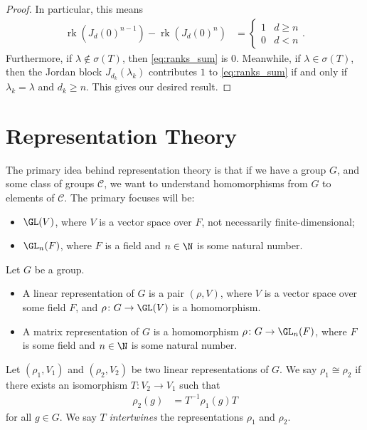 \documentclass[10pt]{mypackage}
\begin{document}
\begin{proof}
  In particular, this means
  \begin{align*}
    \operatorname{rk}\left( J_d(0)^{n-1} \right)- \operatorname{rk}\left( J_d(0)^{n} \right) &= \begin{cases}
      1 &d\geq n\\
      0 & d < n
    \end{cases}.
  \end{align*}
  Furthermore, if $\lambda\notin \sigma(T)$, then \eqref{eq:ranks_sum} is $0$. Meanwhile, if $\lambda\in \sigma(T)$, then the Jordan block $J_{d_k}\left(\lambda_k\right)$ contributes $1$ to \eqref{eq:ranks_sum} if and only if $\lambda_k = \lambda$ and $d_k \geq n$. This gives our desired result.
\end{proof}
\section{Representation Theory}%
The primary idea behind representation theory is that if we have a group $G$, and some class of groups $\mathcal{C}$, we want to understand homomorphisms from $G$ to elements of $\mathcal{C}$. The primary focuses will be:
\begin{itemize}
  \item $\GL(V)$, where $V$ is a vector space over $F$, not necessarily finite-dimensional;
  \item $\GL_n(F)$, where $F$ is a field and $n\in \N$ is some natural number.
\end{itemize}
\begin{definition}
  Let $G$ be a group.
  \begin{itemize}
    \item A linear representation of $G$ is a pair $\left( \rho,V \right)$, where $V$ is a vector space over some field $F$, and $\rho\colon G\rightarrow \GL(V)$ is a homomorphism.
    \item A matrix representation of $G$ is a homomorphism $\rho\colon G\rightarrow \GL_n(F)$, where $F$ is some field and $n\in \N$ is some natural number.
  \end{itemize}
\end{definition}
\begin{definition}
  Let $\left( \rho_1,V_1 \right)$ and $\left( \rho_2,V_2 \right)$ be two linear representations of $G$. We say $\rho_1\cong \rho_2$ if there exists an isomorphism $T\colon V_2\rightarrow V_1$ such that
  \begin{align*}
    \rho_2(g) &= T^{-1}\rho_1(g)T
  \end{align*}
  for all $g\in G$. We say $T$ \textit{intertwines} the representations $\rho_1$ and $\rho_2$.
\end{definition}
\end{document}
